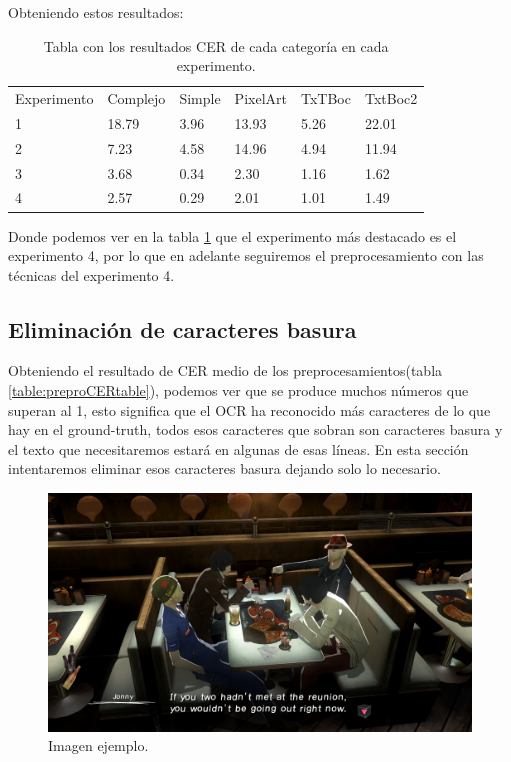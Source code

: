 Obteniendo estos resultados:
\begin{table}[H]
	\begin{tabular}{llllll}
		Experimento & Complejo & Simple & PixelArt & TxTBoc & TxtBoc2                      \\
		 1 & 18.79     & 3.96   & 13.93     & 5.26   & 22.01 \\
		 2 & 7.23     & 4.58   & 14.96     & 4.94   & 11.94 \\
		 3 & 3.68     & 0.34   & 2.30     & 1.16   & 1.62 \\
		 4 & 2.57     & 0.29   & 2.01     & 1.01   & 1.49
	\end{tabular}
	\caption{Tabla con los resultados CER de cada categoría en cada experimento.}
	\label{table:Prepro}
\end{table}
Donde podemos ver en la tabla \ref{table:Prepro} que el experimento más destacado es el experimento 4, por lo que en adelante seguiremos el preprocesamiento con las técnicas del experimento 4.
\subsection{Eliminación de caracteres basura}
\label{subsec:Eliminación de caracter basura}
Obteniendo el resultado de CER medio de los preprocesamientos(tabla \ref{table:preproCERtable}), podemos ver que se produce muchos números que superan al 1, esto significa que el OCR ha reconocido más caracteres de lo que hay en el ground-truth, todos esos caracteres que sobran son caracteres basura y el texto que necesitaremos estará en algunas de esas líneas. En esta sección intentaremos eliminar esos caracteres basura dejando solo lo necesario.
\begin{figure}[H]
	\centering
	\includegraphics[width = 1\textwidth]{Imagenes/Sample_Trash_Char.png}
	\caption{Imagen ejemplo.}
	\label{fig:Trash_Char}
\end{figure}

